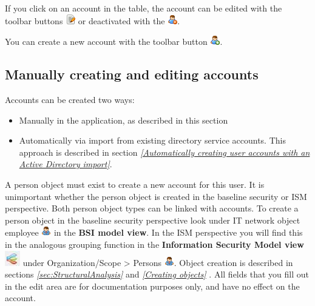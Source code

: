 \documentclass[a4paper,10pt]{book}
\begin{document}
If you click on an account in the table, the account can be edited with the toolbar buttons \includegraphics[height=2ex]{Icon/Edit.png} or deactivated with the \includegraphics[height=2ex]{Icon/user_disabled.png}.

You can create a new account with the toolbar button \includegraphics[height=2ex]{Icon/user_add.png}.

\subsection{Manually creating and editing accounts}
\label{sec:editing-accounts}

Accounts can be created two ways:
\begin{itemize}
\item Manually in the application, as described in this section
\item Automatically via import from existing directory service accounts. This approach is described in section {\em \ref{Automatically
      creating user accounts with an Active Directory import}}.
\end{itemize}

A person object must exist to create a new account for this user. It is unimportant whether the person object is created in the baseline security or ISM perspective. Both person object types can be linked with accounts.
To create a person object in the baseline security perspective look under IT network object employee  \includegraphics[height=2ex]{Icon/Mitarbeiter.png} in the \textbf{BSI model view}. In the ISM perspective you will find this in the analogous grouping function in the \textbf{Information Security Model view} \includegraphics[height=2ex]{Icon/Informationssicherheitsmodell.png} under Organization/Scope > Persons \includegraphics[height=2ex]{Icon/Mitarbeiter.png}.
Object creation is described in sections {\em \ref{sec:StructuralAnalysis} } and {\em \ref{Creating objects} }. All fields that you fill out in the edit area are for documentation purposes only, and have no effect on the account.
\end{document}
